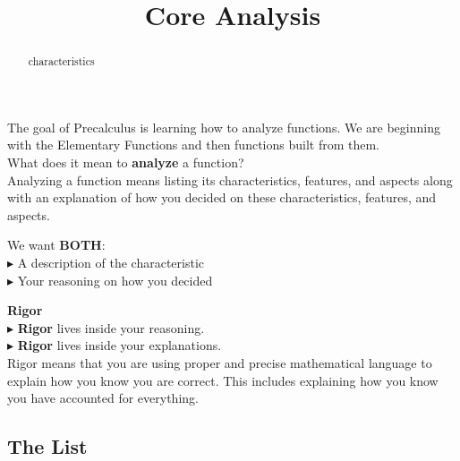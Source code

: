 \documentclass{ximera}
\title{Core Analysis}
\begin{document}
\begin{abstract}
characteristics
\end{abstract}
\maketitle





The goal of Precalculus is learning how to analyze functions.  We are beginning with the Elementary Functions and then functions built from them. \\

What does it mean to \textbf{\textcolor{blue!55!black}{analyze}} a function? \\ 



Analyzing a function means listing its characteristics, features, and aspects along with an explanation of how you decided on these characteristics, features, and aspects.


We want \textbf{BOTH}: \\
\textbf{\textcolor{red!90!darkgray}{$\blacktriangleright$}} A description of the characteristic \\
\textbf{\textcolor{red!90!darkgray}{$\blacktriangleright$}} Your reasoning on how you decided \\



\begin{definition} \textbf{\textcolor{green!50!black}{Rigor}} \\


\textbf{\textcolor{red!90!darkgray}{$\blacktriangleright$}} \textbf{\textcolor{purple!85!blue}{Rigor}} lives inside your reasoning. \\

\textbf{\textcolor{red!90!darkgray}{$\blacktriangleright$}} \textbf{\textcolor{purple!85!blue}{Rigor}} lives inside your explanations. \\



Rigor means that you are using proper and precise mathematical language to explain how you know you are correct. This includes explaining how you know you have accounted for everything.


\end{definition}



\subsection*{The List}
\end{document}
